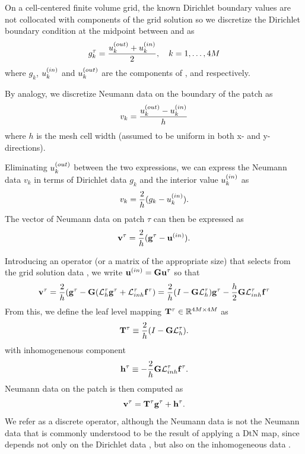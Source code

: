 On a cell-centered finite volume grid, the known Dirichlet boundary values are not collocated with components of the grid solution so we discretize the Dirichlet boundary condition at the midpoint between \ukin and \ukout as
\begin{equation}
g_k^\tau = \frac{u_k^{(out)} + u_k^{(in)}}{2}, \quad k = 1,\hdots , 4M
\end{equation}
where $g_k$, $u_k^{(in)}$ and $u_k^{(out)}$ are the components of \gtau, \uin and \uout respectively.  

By analogy, we discretize Neumann data on the boundary of the patch as
\begin{equation}
v_k = \frac{u_k^{(out)} - u_k^{(in)}}{h}
\end{equation}
where $h$ is the mesh cell width (assumed to be uniform in both x- and y- directions).

Eliminating $u_k^{(out)}$  between the two expressions, we  can express the Neumann data $v_k$ in terms of Dirichlet data $g_k$ and the interior value $u_k^{(in)}$ as
\begin{equation}
v_k = \frac{2}{h}(g_k - u_k^{(in)}).
\end{equation}
The vector of Neumann data on patch $\tau$ can then be expressed as 
\begin{equation}
\mathbf v^{\tau} = \frac{2}{h}(\mathbf g^{\tau} - \mathbf u^{(in)}).
\end{equation}   

Introducing an operator (or a matrix of the appropriate size) \Gop that selects \uin from the grid solution data \utau, we write $\mathbf u^{(in)} = \mathbf G \mathbf u^{\tau}$ so that
\begin{equation}
\mathbf v^{\tau} = \frac{2}{h}(\mathbf g^{\tau} - \mathbf G (\mathcal L_h^{\tau} \mathbf g^{\tau} + \mathcal L_{inh}^{\tau} \mathbf f^{\tau}) = 
\frac{2}{h}(I - \mathbf G \mathcal L_h^{\tau})\mathbf g^{\tau} - \frac{h}{2}\mathbf G \mathcal L_{inh}^{\tau} \mathbf f^{\tau}
\end{equation}
From this, we define the leaf level \DtN mapping $\mathbf T^{\tau} \in \mathbb R^{4M \times 4M}$ as
\begin{equation}
\mathbf T^{\tau} \equiv \frac{2}{h}(I - \mathbf G\mathcal L_h^{\tau}).
\label{eq:Ttau-leaf}
\end{equation}
with inhomogenenous component
\begin{equation}
\mathbf h^{\tau} \equiv -\frac{2}{h}\mathbf G\mathcal L_{inh}^{\tau} \mathbf f^{\tau}.
\label{eq:htau-leaf}
\end{equation}
Neumann data on the patch is then computed as
\begin{equation}
\mathbf v^{\tau} = \mathbf T^{\tau} \mathbf g^{\tau} + \mathbf h^{\tau}.
\label{eq:vtau}
\end{equation}
We refer \Ttau as a discrete \DtN operator, although the Neumann data \vtau is not the Neumann data that is commonly understood to be the result of applying a DtN map, since \vtau depends not only on the Dirichlet data \gtau, but also on the inhomogeneous data \ftau.  


